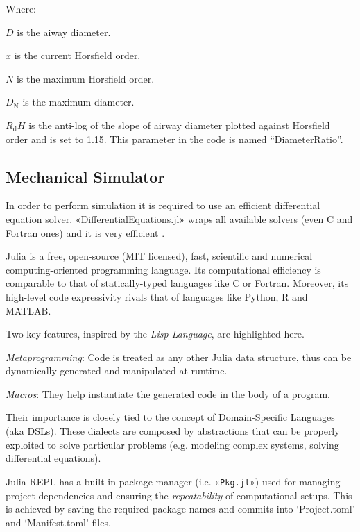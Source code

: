 Where:
\begin{description}
\item $D$ is the aiway diameter.
\item $x$ is the current Horsfield order.
\item $N$ is the maximum Horsfield order.
\item $D_{\text{N}}$ is the maximum diameter.
\item $R_{\text{d}} H$ is the anti-log of the slope of airway diameter
  plotted against Horsfield order and is set to 1.15.  This parameter
  in the code is named ``DiameterRatio''.
\end{description}
  
\subsection{Mechanical Simulator}
\label{subsec:simulator_development}

In order to perform simulation it is required to use an efficient
differential equation solver.  «DifferentialEquations.jl» wraps all
available solvers (even C and Fortran ones) and it is very efficient
\cite{diffeqdocs2024,rackauckas2017}.

Julia is a free, open-source (MIT licensed), fast, scientific and
numerical computing-oriented programming language.  Its computational
efficiency is comparable to that of statically-typed languages like C
or Fortran.  Moreover, its high-level code expressivity rivals that of
languages like Python, R and MATLAB\cite{juliadocs2024}.

Two key features, inspired by the \emph{Lisp Language}, are
highlighted here.

\begin{description}
\item \emph{Metaprogramming}: Code is treated as any other Julia data
  structure, thus can be dynamically generated and manipulated at
  runtime.
\item \emph{Macros}: They help instantiate the generated code in the
  body of a program.
\end{description}

Their importance is closely tied to the concept of Domain-Specific
Languages (aka DSLs).  These dialects are composed by abstractions
that can be properly exploited to solve particular problems
(e.g. modeling complex systems, solving differential equations).

Julia REPL has a built-in package manager (i.e. «\texttt{Pkg.jl}»)
used for managing project dependencies and ensuring the
\emph{repeatability} of computational setups.  This is achieved by
saving the required package names and commits into `Project.toml' and
`Manifest.toml' files.

